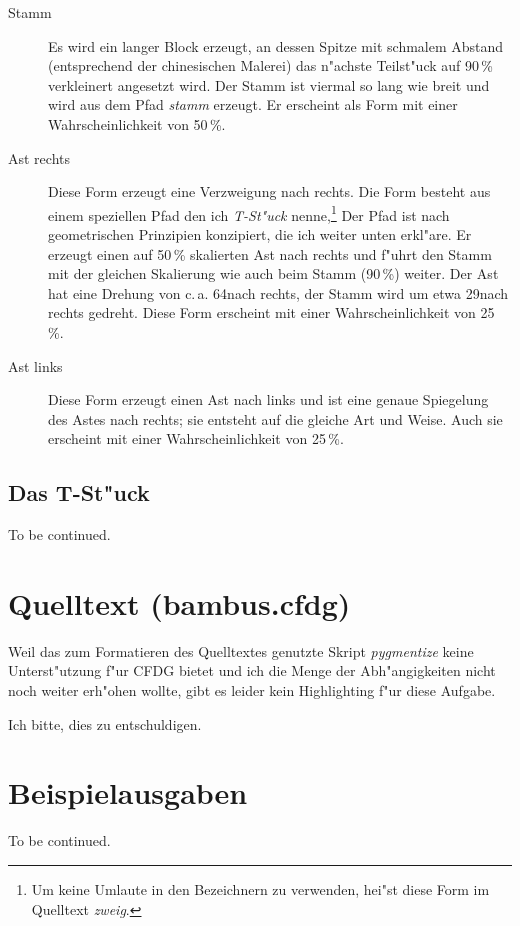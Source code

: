 \documentclass{scrreprt}
\begin{document}
\begin{description}
\item[Stamm] Es wird ein langer Block erzeugt, an dessen Spitze mit schmalem
  Abstand (entsprechend der chinesischen Malerei) das n"achste Teilst"uck
  auf 90\,\% verkleinert angesetzt wird.  Der Stamm ist viermal so lang wie
  breit und wird aus dem Pfad \emph{stamm} erzeugt. Er erscheint als Form mit
  einer Wahrscheinlichkeit von 50\,\%. 
  
\item[Ast rechts] Diese Form erzeugt eine Verzweigung nach rechts.  Die Form
  besteht aus einem speziellen Pfad den ich \emph{T-St"uck} nenne,\footnote{Um
  keine Umlaute in den Bezeichnern zu verwenden, hei"st diese Form im Quelltext
  \emph{zweig}.} Der Pfad ist nach geometrischen Prinzipien konzipiert, die ich
  weiter unten erkl"are.  Er erzeugt einen auf 50\,\% skalierten Ast nach rechts
  und f"uhrt den Stamm mit der gleichen Skalierung wie auch beim Stamm (90\,\%)
  weiter.  Der Ast hat eine Drehung von c.\,a. 64\textdegree nach rechts, der
  Stamm wird um etwa 29\textdegree nach rechts gedreht.  Diese Form erscheint
  mit einer Wahrscheinlichkeit von 25\,\%.

\item[Ast links] Diese Form erzeugt einen Ast nach links und ist eine genaue
  Spiegelung des Astes nach rechts; sie entsteht auf die gleiche Art und Weise.
  Auch sie erscheint mit einer Wahrscheinlichkeit von 25\,\%.
\end{description}

\section{Das T-St"uck}

To be continued. %

\chapter{Quelltext (bambus.cfdg)}

Weil das zum Formatieren des Quelltextes genutzte Skript \emph{pygmentize} keine
Unterst"utzung f"ur CFDG bietet und ich die Menge der Abh"angigkeiten nicht noch
weiter erh"ohen wollte, gibt es leider kein Highlighting f"ur diese Aufgabe.

Ich bitte, dies zu entschuldigen.


\chapter{Beispielausgaben}

To be continued. %
\end{document}
